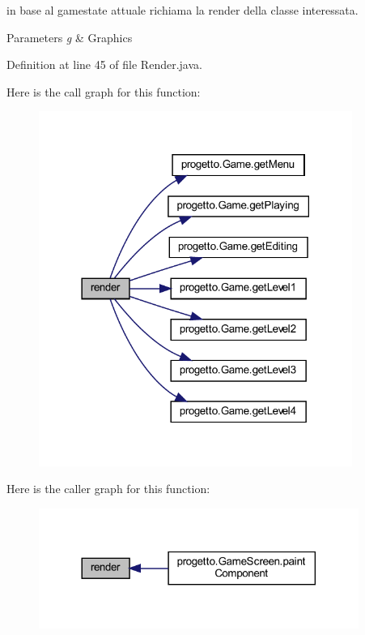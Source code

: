 in base al gamestate attuale richiama la render della classe interessata. 


\begin{DoxyParams}{Parameters}
{\em g} & Graphics \\
\hline
\end{DoxyParams}


Definition at line 45 of file Render.\+java.

Here is the call graph for this function\+:\nopagebreak
\begin{figure}[H]
\begin{center}
\leavevmode
\includegraphics[width=290pt]{classprogetto_1_1_render_a203b6ad9d5e4d54dd1152986eec4dedc_cgraph}
\end{center}
\end{figure}
Here is the caller graph for this function\+:\nopagebreak
\begin{figure}[H]
\begin{center}
\leavevmode
\includegraphics[width=296pt]{classprogetto_1_1_render_a203b6ad9d5e4d54dd1152986eec4dedc_icgraph}
\end{center}
\end{figure}


